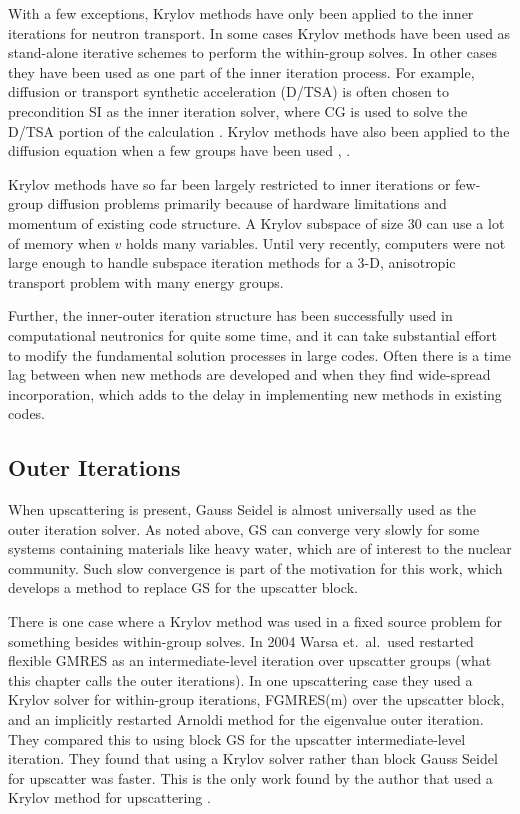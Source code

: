 With a few exceptions, Krylov methods have only been applied to the inner iterations for neutron transport. In some cases Krylov methods have been used as stand-alone iterative schemes to perform the within-group solves. In other cases they have been used as one part of the inner iteration process. For example, diffusion or transport synthetic acceleration (D/TSA) is often chosen to precondition SI as the inner iteration solver, where CG is used to solve the D/TSA portion of the calculation \cite{Gupta2004}. Krylov methods have also been applied to the diffusion equation when a few groups have been used \cite{Suetomi1988}, \cite{Verdu1999}.

Krylov methods have so far been largely restricted to inner iterations or few-group diffusion problems primarily because of hardware limitations and momentum of existing code structure. A Krylov subspace of size 30 can use a lot of memory when $v$ holds many variables. Until very recently, computers were not large enough to handle subspace iteration methods for a 3-D, anisotropic transport problem with many energy groups.  

Further, the inner-outer iteration structure has been successfully used in computational neutronics for quite some time, and it can take substantial effort to modify the fundamental solution processes in large codes. Often there is a time lag between when new methods are developed and when they find wide-spread incorporation, which adds to the delay in implementing new methods in existing codes.

\subsection{Outer Iterations}
When upscattering is present, Gauss Seidel is almost universally used as the outer iteration solver. As noted above, GS can converge very slowly for some systems containing materials like heavy water, which are of interest to the nuclear community. Such slow convergence is part of the motivation for this work, which develops a method to replace GS for the upscatter block. 

There is one case where a Krylov method was used in a fixed source problem for something besides within-group solves. In 2004 Warsa et.\ al.\ used restarted flexible GMRES as an intermediate-level iteration over upscatter groups (what this chapter calls the outer iterations). In one upscattering case they used a Krylov solver for within-group iterations, FGMRES(m) over the upscatter block, and an implicitly restarted Arnoldi method for the eigenvalue outer iteration. They compared this to using block GS for the upscatter intermediate-level iteration. They found that using a Krylov solver rather than block Gauss Seidel for upscatter was faster. This is the only work found by the author that used a Krylov method for upscattering \cite{Warsa2004a}. 

